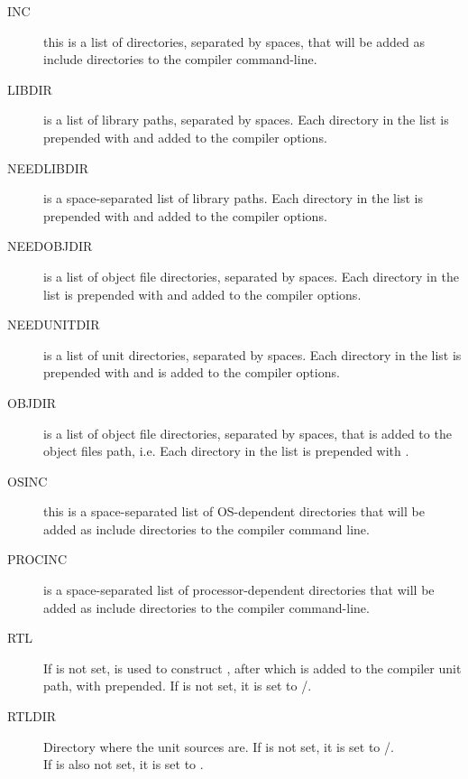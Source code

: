 \documentclass{report}
\begin{document}
\begin{description}
\item[INC] this is a list of directories, separated by spaces, that will 
be added as include directories to the compiler command-line.

\item[LIBDIR] is a list of library paths, separated by spaces. Each
directory in the list is prepended with  and added to the 
compiler options.

\item[NEEDLIBDIR] is a space-separated list of library paths. Each
directory in the list is 
prepended with  and added to the compiler options.

\item[NEEDOBJDIR] is a list of object file directories, separated by
 spaces. Each directory in the list is prepended with  and 
added to the compiler options.

\item[NEEDUNITDIR] is a list of unit directories, separated by spaces.
Each directory in the list is prepended with  and is added to the
compiler options.

\item[OBJDIR] is a list of object file directories, separated by spaces, that is 
added to the object files path, i.e. Each directory in the list is prepended with 
.

\item[OSINC] this is a space-separated list of OS-dependent directories 
that will be added as include directories to the compiler command line.

\item[PROCINC] is a space-separated list of processor-dependent directories 
that will be added as include directories to the compiler command-line.

\item[RTL] If  is not set,  is used to construct
, after which  is added to the compiler unit 
path, with  prepended. If  is not set, it is set
 to /.

\item[RTLDIR] Directory where the  unit sources are.
If  is not set, it is set to /. \\
If  is also not set, it is set to .



\end{description}
\end{document}
